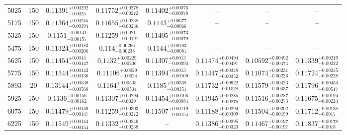 \documentclass[twocolumn]{aastex63}
\begin{document}
\begin{table*}[ht!]
\begin{tabular}{cccccccc}
5025     &      150 &   $0.11391^{+0.00292}_{-0.0025}$ &  $0.11752^{+0.00278}_{-0.00272}$ &  $0.11402^{+0.00076}_{-0.00078}$ &                              -- &                              -- &                              -- \\
5175     &      150 &  $0.11364^{+0.00245}_{-0.00394}$ &  $0.11655^{+0.00238}_{-0.00236}$ &   $0.1143^{+0.00077}_{-0.00066}$ &                              -- &                              -- &                              -- \\
5325     &      150 &   $0.1151^{+0.00141}_{-0.00157}$ &   $0.11259^{+0.0021}_{-0.00191}$ &  $0.11405^{+0.00073}_{-0.00079}$ &                              -- &                              -- &                              -- \\
5475     &      150 &  $0.11324^{+0.00183}_{-0.00206}$ &    $0.114^{+0.00266}_{-0.00238}$ &   $0.1144^{+0.00103}_{-0.00081}$ &                              -- &                              -- &                              -- \\
5625     &      150 &   $0.11454^{+0.0014}_{-0.00147}$ &   $0.1132^{+0.00229}_{-0.00206}$ &   $0.11307^{+0.0013}_{-0.00093}$ &  $0.11474^{+0.00494}_{-0.00491}$ &  $0.10592^{+0.00492}_{-0.00474}$ &  $0.11339^{+0.00219}_{-0.00222}$ \\
5775     &      150 &  $0.11544^{+0.00142}_{-0.00136}$ &    $0.11106^{+0.0029}_{-0.0024}$ &   $0.11394^{+0.0013}_{-0.00109}$ &  $0.11447^{+0.00348}_{-0.00352}$ &  $0.11074^{+0.00231}_{-0.00226}$ &  $0.11724^{+0.00235}_{-0.00228}$ \\
5893     &       20 &  $0.13144^{+0.00539}_{-0.00568}$ &   $0.1164^{+0.00503}_{-0.00504}$ &   $0.1185^{+0.00338}_{-0.00351}$ &  $0.11732^{+0.00922}_{-0.01028}$ &  $0.11579^{+0.00423}_{-0.00437}$ &  $0.11796^{+0.00434}_{-0.00517}$ \\
5925     &      150 &   $0.1136^{+0.00156}_{-0.00162}$ &   $0.11307^{+0.00294}_{-0.0029}$ &  $0.11454^{+0.00106}_{-0.00084}$ &  $0.11945^{+0.00285}_{-0.00275}$ &  $0.11516^{+0.00287}_{-0.00273}$ &  $0.11675^{+0.00194}_{-0.00224}$ \\
6075     &      150 &  $0.11479^{+0.00149}_{-0.00147}$ &  $0.11259^{+0.00303}_{-0.00272}$ &  $0.11507^{+0.00119}_{-0.00154}$ &  $0.11188^{+0.00294}_{-0.00309}$ &  $0.11504^{+0.00202}_{-0.00199}$ &   $0.11712^{+0.00188}_{-0.0017}$ \\
6225     &      150 &  $0.11549^{+0.00144}_{-0.00154}$ &  $0.11332^{+0.00249}_{-0.00238}$ &                              -- &  $0.11386^{+0.00295}_{-0.00323}$ &  $0.11467^{+0.00197}_{-0.00197}$ &   $0.11837^{+0.00178}_{-0.0018}$ \\

\end{tabular}
\end{table*}
\end{document}
